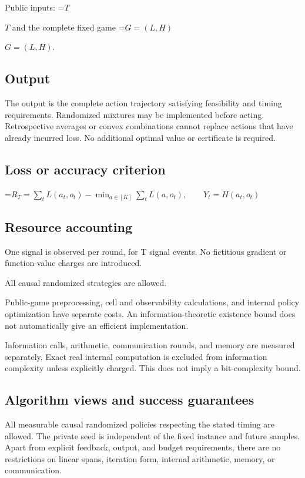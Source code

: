 \documentclass[10pt,a4paper]{article}
\newcommand{\AtlasMath}[1]{\par\begingroup\centering\setbox0=\hbox{$\displaystyle #1$}\ifdim\wd0>1.4\linewidth\typeout{ATLAS WIDE FORMULA: \the\wd0}\fi\ifdim\wd0>\linewidth\resizebox{\linewidth}{!}{\box0}\else\box0\fi\par\endgroup}
\newcommand{\AtlasInlineMath}[1]{\begingroup\setbox0=\hbox{$#1$}\ifdim\wd0>.4\linewidth\endgroup\AtlasMath{#1}\else\endgroup$#1$\fi}
\begin{document}
Public inputs: \AtlasInlineMath{T} and the complete fixed game \AtlasInlineMath{G=(L,H)}.

\subsection{Output}
The output is the complete action trajectory satisfying feasibility and timing requirements. Randomized mixtures may be implemented before acting. Retrospective averages or convex combinations cannot replace actions that have already incurred loss. No additional optimal value or certificate is required.

\subsection{Loss or accuracy criterion}

\AtlasMath{R_T=\sum_tL(a_t,o_t)-\min_{a\in[K]}\sum_tL(a,o_t),\qquad Y_t=H(a_t,o_t)}


\subsection{Resource accounting}
One signal is observed per round, for T signal events. No fictitious gradient or function-value charges are introduced.

All causal randomized strategies are allowed.

Public-game preprocessing, cell and observability calculations, and internal policy optimization have separate costs. An information-theoretic existence bound does not automatically give an efficient implementation.

Information calls, arithmetic, communication rounds, and memory are measured separately. Exact real internal computation is excluded from information complexity unless explicitly charged. This does not imply a bit-complexity bound.

\subsection{Algorithm views and success guarantees}
All measurable causal randomized policies respecting the stated timing are allowed. The private seed is independent of the fixed instance and future samples. Apart from explicit feedback, output, and budget requirements, there are no restrictions on linear spans, iteration form, internal arithmetic, memory, or communication.
\end{document}
